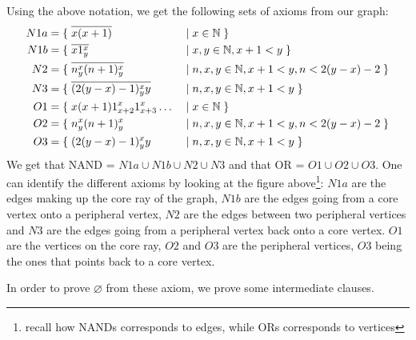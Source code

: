 Using the above notation, we get the following sets of axioms from our graph:
\begin{align}
  N1a &= \{\; \overline{x(x+1)} \;&&|\; x \in \mathbb{N} \; \} \\
	N1b &= \{\; \overline{x1^x_y} \;&&|\; x,y \in \mathbb{N}, x+1 < y \; \} \\
	N2 &= \{\; \overline{n^x_y(n+1)^x_y} \;&&|\; n,x,y \in \mathbb{N}, x+1 < y, n < 2(y-x) - 2 \; \} \\
	N3 &= \{\; \overline{(2(y-x)-1)^x_yy} \;&&|\; n,x,y \in \mathbb{N}, x+1 < y \; \} \\
	O1 &= \{\; x(x+1)1^x_{x+2}1^x_{x+3}\dots \;&&|\; x \in \mathbb{N} \; \} \\
  O2 &= \{\; n^x_y(n+1)^x_y \;&&|\; n,x,y \in \mathbb{N}, x+1 < y, n < 2(y-x) - 2 \; \} \\
	O3 &= \{\; (2(y-x)-1)^x_yy \;&&|\; n,x,y \in \mathbb{N}, x+1 < y \; \}
\end{align}
We get that NAND = $N1a \cup N1b \cup N2 \cup N3$ and that OR = $O1 \cup O2 \cup O3$.
One can identify the different axioms by looking at the figure above\footnote{recall how NANDs corresponds to edges, while ORs corresponds to vertices}:
$N1a$ are the edges making up the core ray of the graph, $N1b$ are the edges going from a core vertex onto a peripheral vertex, $N2$ are the edges between two peripheral vertices and $N3$ are the edges going from a peripheral vertex back onto a core vertex.
$O1$ are the vertices on the core ray, $O2$ and $O3$ are the peripheral vertices, $O3$ being the ones that points back to a core vertex.

In order to prove $\varnothing$ from these axiom, we prove some intermediate clauses.
